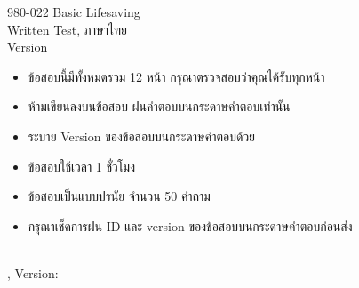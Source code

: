 \documentclass[a4paper,16pt]{examdesign}
\begin{document}
\begin{frontmatter}
	\vspace*{2in}
	\begin{center}
		{\huge 980-022 Basic Lifesaving} \\
		\vspace{1in}
		{\huge Written Test, ภาษาไทย} \\
		\vspace{1in}
		{\huge Version } \\
		\vspace{1in}
		\begin{itemize}
		\item ข้อสอบนี้มีทั้งหมดรวม 12 หน้า กรุณาตรวจสอบว่าคุณได้รับทุกหน้า 
		\item ห้ามเขียนลงบนข้อสอบ ฝนคำตอบบนกระดาษคำตอบเท่านั้น
		\item ระบาย Version ของข้อสอบบนกระดาษคำตอบด้วย
		\item ข้อสอบใช้เวลา 1 ชั่วโมง
		\item ข้อสอบเป็นแบบปรนัย จำนวน 50 คำถาม
		\item กรุณาเช็คการฝน ID และ version ของข้อสอบบนกระดาษคำตอบก่อนส่ง
		\end{itemize}
	\end{center}
	\vfill
\end{frontmatter}


\begin{examtop}
	{\parbox{3in}{\classdata \\
	\examtype, Version: }}
\end{examtop}
\end{document}
